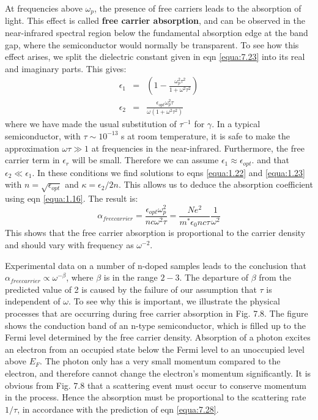 \documentclass[12pt]{book}
\begin{document}
At frequencies above $\omega_p$, the presence of free carriers leads to the absorption of light. This effect is called \textbf{free carrier absorption}, and can be observed in the near-infrared spectral region below the fundamental absorption edge at the band gap, where the semiconductor would normally be transparent. To see how this effect arises, we split the dielectric constant given in eqn \ref{equa:7.23} into its real and imaginary parts. This gives:
\begin{eqnarray}
  \epsilon_1 &=& \left(1-\frac{\omega_p^2\tau^2}{1+\omega^2\tau^2}\right)\label{equa:7.26} \\
  \epsilon_2 &=& \frac{\epsilon_{opt}\omega_p^2\tau}{\omega(1+\omega^2\tau^2)} \label{equa:7.27}
\end{eqnarray}
where we have made the usual substitution of $\tau^{-1}$ for $\gamma$. In a typical semiconductor, with $\tau\sim10^{-13}$ s at room temperature, it is safe to make the approximation  $\omega\tau\gg1$ at frequencies in the near-infrared. Furthermore, the free carrier term in $\epsilon_r$ will be small. Therefore we can assume $\epsilon_1\approx\epsilon_{opt}$. and that $\epsilon_2\ll\epsilon_1$. In these conditions we find solutions to eqns \ref{equa:1.22} and \ref{equa:1.23} with $n=\sqrt{\epsilon_{opt}}$ and $\kappa = \epsilon_2/2n$. This allows us to deduce the absorption coefficient using eqn \ref{equa:1.16}. The result is:
\begin{equation}\label{equa:7.28}
  \alpha_{free carrier}=\frac{\epsilon_{opt}\omega_p^2}{nc\omega^2\tau}=\frac{Ne^2}{m^*\epsilon_0nc\tau}\frac{1}{\omega^2}
\end{equation}
This shows that the free carrier absorption is proportional to the carrier density and should vary with frequency as $\omega^{-2}$.

Experimental data on a number of n-doped samples leads to the conclusion that $\alpha_{free carrier}\propto\omega^{-\beta}$, where $\beta$ is in the range $2-3$. The departure of $\beta$ from the predicted value of 2 is caused by the failure of our assumption that $\tau$ is independent of $\omega$. To see why this is important, we illustrate the physical processes that are occurring during free carrier absorption in Fig. 7.8. The figure shows the conduction band of an n-type semiconductor, which is filled up to the Fermi level determined by the free carrier density. Absorption of a photon excites an electron from an occupied state below the Fermi level to an unoccupied level above $E_F$. The photon only has a very small momentum compared to the electron, and therefore cannot change the electron's momentum significantly. It is obvious from Fig. 7.8 that a scattering event must occur to conserve momentum in the process. Hence the absorption must be proportional to the scattering rate $1/\tau$, in accordance with the prediction of eqn \ref{equa:7.28}.
\end{document}
